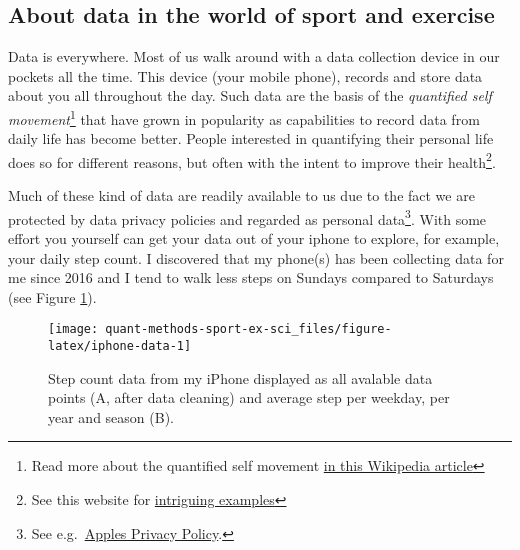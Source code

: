 \documentclass[
]{article}
\begin{document}
\hypertarget{about-data-in-the-world-of-sport-and-exercise}{%
\subsection{About data in the world of sport and exercise}\label{about-data-in-the-world-of-sport-and-exercise}}

Data is everywhere. Most of us walk around with a data collection device in our pockets all the time. This device (your mobile phone), records and store data about you all throughout the day. Such data are the basis of the \emph{quantified self movement}\footnote{Read more about the quantified self movement \href{https://en.wikipedia.org/wiki/Quantified_self}{in this Wikipedia article}} that have grown in popularity as capabilities to record data from daily life has become better. People interested in quantifying their personal life does so for different reasons, but often with the intent to improve their health\footnote{See this website for \href{https://quantifiedself.com/show-and-tell/}{intriguing examples}}.

Much of these kind of data are readily available to us due to the fact we are protected by data privacy policies and regarded as personal data\footnote{See e.g.~\href{https://www.apple.com/legal/privacy/en-ww/}{Apples Privacy Policy}.}. With some effort you yourself can get your data out of your iphone to explore, for example, your daily step count. I discovered that my phone(s) has been collecting data for me since 2016 and I tend to walk less steps on Sundays compared to Saturdays (see Figure \ref{fig:iphone-data}).

\begin{figure}

{\centering \texttt{[image: quant-methods-sport-ex-sci\_files/figure-latex/iphone-data-1]} 

}

\caption{Step count data from my iPhone displayed as all avalable data points (A, after data cleaning) and average step per weekday, per year and season (B).}\label{fig:iphone-data}
\end{figure}
\end{document}
